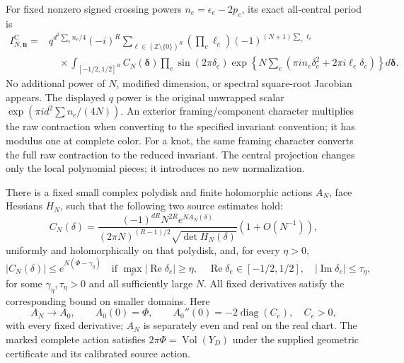 For fixed nonzero signed crossing powers \(n_e=\epsilon_e-2p_e\), its
exact all-central period is \begin{equation}\label{mca:eq-2}
\begin{split}
 I_{N,\mathbf n}^{\mathrm C}
 ={}&q^{d^2\sum_e n_e/4}(-i)^R
 \sum_{\boldsymbol\ell\in(\mathbb Z\setminus\{0\})^R}
       \left(\prod_e\ell_e\right)
             (-1)^{(N+1)\sum_e\ell_e}\\
 &\quad\times\int_{[-1/2,1/2]^R}
       C_N(\boldsymbol\delta)\prod_e\sin(2\pi\delta_e)
       \exp\left\{N\sum_e
         (\pi i n_e\delta_e^2+2\pi i\ell_e\delta_e)\right\}
                  d\boldsymbol\delta .
 \end{split}
\end{equation} No additional power of \(N\), modified dimension, or spectral
square-root Jacobian appears. The displayed \(q\) power is the original
unwrapped scalar \(\exp(\pi i d^2\sum n_e/(4N))\). An exterior
framing/component character multiplies the raw contraction when
converting to the specified invariant convention; it has modulus one at
complete color. For a knot, the same framing character converts the full raw
contraction to the reduced invariant. The central projection changes
only the local polynomial pieces; it introduces no new normalization.

There is a fixed small complex polydisk and finite holomorphic actions
\(A_N\), face Hessians \(H_N\), such that the following two source
estimates hold: \begin{equation}\label{mca:eq-H1}
C_N(\delta)=
 \frac{(-1)^{dR}N^{2R}e^{NA_N(\delta)}}
 {(2\pi N)^{(R-1)/2}\sqrt{\det H_N(\delta)}}
                     (1+O(N^{-1})),
\end{equation} uniformly and holomorphically on that polydisk, and, for every
\(\eta>0\), \begin{equation}\label{mca:eq-H2}
|C_N(\delta)|\le e^{N(\Phi-\gamma_\eta)}
 \quad\text{if }\max_e|\operatorname{Re}\delta_e|\ge\eta,
 \quad\operatorname{Re}\delta_e\in[-1/2,1/2],
 \quad|\operatorname{Im}\delta_e|\le\tau_\eta,
\end{equation} for some \(\gamma_\eta,\tau_\eta>0\) and all sufficiently large
\(N\). All fixed derivatives satisfy the corresponding bound on smaller
domains. Here \begin{equation}\label{mca:eq-3}
A_N\longrightarrow A_0,\qquad A_0(0)=\Phi,\qquad
 A_0''(0)=-2\operatorname{diag}(C_e),\quad C_e>0,
\end{equation} with every fixed derivative; \(A_N\) is separately even and real on
the real chart. The marked complete action satisfies
\(2\pi\Phi=\operatorname{Vol}(Y_D)\) under the supplied geometric
certificate and its calibrated source action.

